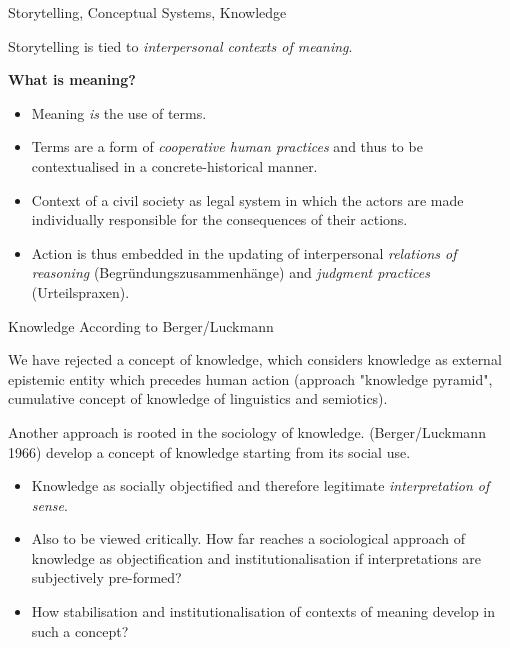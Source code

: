 \documentclass{beamer}
\begin{document}
\begin{frame}{Storytelling, Conceptual Systems, Knowledge}

Storytelling is tied to \emph{interpersonal contexts of meaning}.

\textbf{What is meaning?}
\begin{itemize}
\item Meaning \emph{is} the use of terms.
\item Terms are a form of \emph{cooperative human practices} and thus to be
  contextualised in a concrete-historical manner.
\item Context of a civil society as legal system in which the actors are made
  individually responsible for the consequences of their actions.
\item Action is thus embedded in the updating of interpersonal \emph{relations
  of reasoning} (Begründungszusammenhänge) and \emph{judgment practices}
  (Urteilspraxen).
\end{itemize}
\end{frame}
\begin{frame}{Knowledge According to Berger/Luckmann}

We have rejected a concept of knowledge, which considers knowledge as external
epistemic entity which precedes human action (approach "knowledge pyramid",
cumulative concept of knowledge of linguistics and semiotics).

Another approach is rooted in the sociology of knowledge.  (Berger/Luckmann
1966) develop a concept of knowledge starting from its social use.
\begin{itemize}
\item Knowledge as socially objectified and therefore legitimate
  \emph{interpretation of sense}.
\item Also to be viewed critically. How far reaches a sociological approach of
  knowledge as objectification and institutionalisation if interpretations are
  subjectively pre-formed?
\item How stabilisation and institutionalisation of contexts of meaning
  develop in such a concept?
\end{itemize}
\end{frame}
\end{document}
